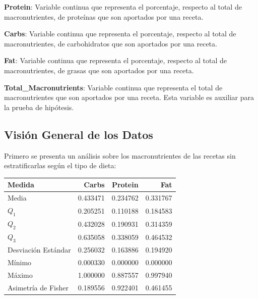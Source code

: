 \documentclass[12pt,a4paper]{article}
\begin{document}
{{\begin{itemize}[label=\textbullet]
{                \item \textbf{Protein}: Variable continua que representa el 
                porcentaje, respecto al total de macronutrientes, de proteínas que son 
                aportados por una receta.

                \item \textbf{Carbs}: Variable continua que representa el 
                porcentaje, respecto al total de macronutrientes, de carbohidratos que 
                son aportados por una receta.
                
                \item \textbf{Fat}: Variable continua que representa el 
                porcentaje, respecto al total de macronutrientes, de grasas que son 
                aportados por una receta.
                
                \item \textbf{Total\_Macronutrients}: Variable continua que representa 
                el total de macronutrientes que son aportados por una receta. Esta variable 
                es auxiliar para la prueba de hipótesis.
            }
            \end{itemize}
        }

        \subsection{Visión General de los Datos}
        {
            Primero se presenta un análisis sobre los macronutrientes de 
            las recetas sin estratificarlas según el tipo de dieta:

            \begin{center}
                \begin{xtabular}{w{l}{}|rrr}
                \toprule
                    Medida & Carbs & Protein & Fat \\  
                \midrule
                    Media               & 0.433471 & 0.234762 & 0.331767 \\
                    $Q_1$               & 0.205251 & 0.110188 & 0.184583 \\
                    $Q_2$               & 0.432028 & 0.190931 & 0.314359 \\
                    $Q_3$               & 0.635058 & 0.338059 & 0.464532 \\
                    Desviación Estándar & 0.256032 & 0.163886 & 0.194920 \\
                    Mínimo              & 0.000330 & 0.000000 & 0.000000 \\
                    Máximo              & 1.000000 & 0.887557 & 0.997940 \\
                    Asimetría de Fisher & 0.189556 & 0.922401 & 0.461455 \\
                \bottomrule
                \end{xtabular}
            \end{center}

}}
\end{document}
